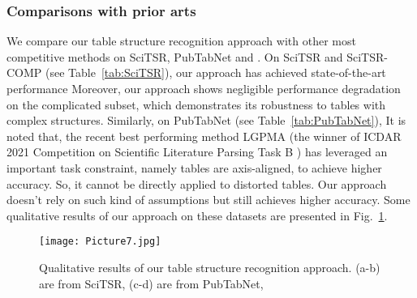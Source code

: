 \documentclass[final,3p,times,twocolumn]{elsarticle}
\begin{document}
\subsubsection{Comparisons with prior arts}
We compare our table structure recognition approach with other most competitive methods on SciTSR, PubTabNet and {\color{black}{cTDaR TrackB2-Modern}}. 
On SciTSR and SciTSR-COMP (see Table~\ref{tab:SciTSR}), our approach has achieved state-of-the-art performance {\color{black}{with the best F1-score of 99.3\% and 98.7\% on the full testing set and the complicated subset, respectively.}} Moreover, our approach shows negligible performance degradation on the complicated subset, which demonstrates its robustness to tables with complex structures. Similarly, on PubTabNet (see Table~\ref{tab:PubTabNet}), {\color{black}{our approach has also achieved the best TEDS-Struct score of 97.0\%.}} It is noted that, the recent best performing method LGPMA \cite{qiao2021lgpma} (the winner of ICDAR 2021 Competition on Scientific Literature Parsing Task B \cite{jimeno2021icdar}) has leveraged an important task constraint, namely tables are axis-aligned, to achieve higher accuracy. So, it cannot be directly applied to distorted tables. Our approach doesn’t rely on such kind of assumptions but still achieves higher accuracy. {}
Some qualitative results of our approach on these datasets are presented in Fig.~\ref{fig:TSR_demo}.
\begin{figure}[t]
    \centering
    \setlength{\abovecaptionskip}{-0.5cm}
    \texttt{[image: Picture7.jpg]}
    \caption{Qualitative results of our table structure recognition approach. (a-b) are from SciTSR, (c-d) are from PubTabNet, {\color{black}{(e-f) are cropped from cTDaR TrackB2-Modern.}}}
    \label{fig:TSR_demo}
\end{figure}
\end{document}
